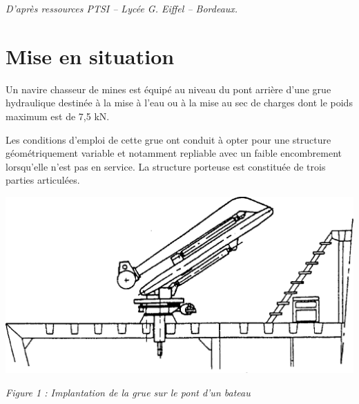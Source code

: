 \documentclass[10pt]{article}
\newif\ifprof
\newif\ifxp
\begin{document}
\ifxp

\else

\fi


\begin{flushright}
\textit{D'après ressources PTSI -- Lycée G. Eiffel -- Bordeaux.}
\end{flushright}
\setlength{\parskip}{0ex plus 0.2ex minus 0ex}
 \renewcommand{\contentsname}{}
 \renewcommand{\baselinestretch}{1}




\section{Mise en situation}

\ifprof
\else
\begin{minipage}[c]{.49\linewidth}
Un navire chasseur de mines est équipé au niveau du pont arrière d'une grue hydraulique destinée à la mise à l'eau ou à la mise au sec de charges dont le poids maximum est de 7,5 kN.

Les conditions d'emploi de cette grue ont conduit à opter pour une structure géométriquement variable et notamment repliable avec un faible encombrement lorsqu'elle n'est pas en service. La structure porteuse est constituée de trois parties articulées. 
\end{minipage} \hfill
\begin{minipage}[c]{.49\linewidth}
\begin{center}
\includegraphics[width=.95\textwidth]{images/Grue}

\textit{Figure 1 : Implantation de la grue sur le pont d'un bateau}
\end{center}
\end{minipage} 

\vspace{.25cm}
\end{document}
